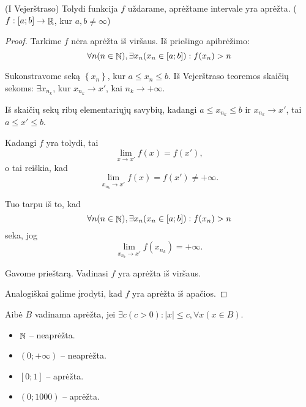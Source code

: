 \begin{prop}
  (I Vejerštraso) Tolydi funkcija $f$ uždarame, aprėžtame intervale yra
  aprėžta. ($f : [a;b] \to \mathop{\mathbb{R}}$, kur $a, b \neq \infty$)

  \begin{proof}
    Tarkime $f$ nėra aprėžta iš viršaus. Iš priešingo apibrėžimo:
    \begin{equation*}
      \forall n (n \in \mathop{\mathbb{N}}), \exists x_{n} (x_{n} \in [a;b]) :
        f(x_{n}) > n
    \end{equation*}

    Sukonstravome seką $\left\{ x_{n} \right\}$, kur 
    $a \leq x_{n} \leq b$. Iš Vejerštraso teoremos skaičių sekoms:
    $ \exists x_{n_{k}}$, kur $x_{n_{k}} \to x'$, 
    kai $n_{k} \to +\infty$.

    Iš skaičių sekų ribų elementariųjų savybių, kadangi 
    $a \leq x_{n_{k}} \leq b$ ir $x_{n_{k}} \to x'$, tai 
    $a \leq x' \leq b$.

    Kadangi $f$ yra tolydi, tai 
    \begin{equation*}
      \lim _{x \to x'} f(x) = f(x'),
    \end{equation*}
    o tai reiškia, kad
    \begin{equation*}
      \lim _{x_{n_{k}} \to x'} f(x) = f(x') \neq +\infty.
    \end{equation*}

    Tuo tarpu iš to, kad
    \begin{equation*}
      \forall n (n \in \mathop{\mathbb{N}}), \exists x_{n} (x_{n} \in [a;b]) :
        f(x_{n}) > n
    \end{equation*}
    seka, jog
    \begin{equation*}
      \lim _{x_{n_{k}} \to x'} f(x_{n_{k}}) = +\infty.
    \end{equation*}

    Gavome prieštarą. Vadinasi $f$ yra aprėžta iš viršaus. 

    Analogiškai galime įrodyti, kad $f$ yra aprėžta iš apačios.
  \end{proof}

\end{prop}

\begin{exmp}
  Aibė $B$ vadinama aprėžta, jei 
  $\exists c (c > 0) : |x| \leq c, \forall x (x \in B)$.
  \begin{itemize}
    \item $\mathop{\mathbb{N}}$ – neaprėžta.
    \item $(0; +\infty)$ – neaprėžta.
    \item $[0; 1]$ – aprėžta.
    \item $(0; 1000)$ – aprėžta.
  \end{itemize}
\end{exmp}


